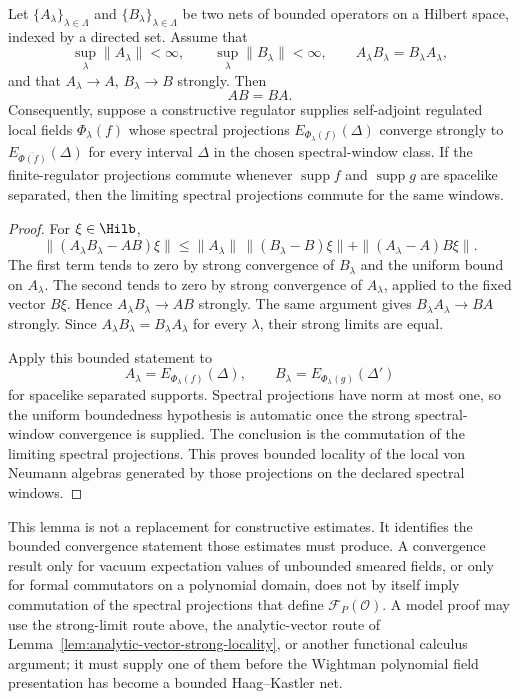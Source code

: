 \begin{lemma}
\label{lem:strong-limit-regulated-locality}
Let \(\{A_\lambda\}_{\lambda\in\Lambda}\) and
\(\{B_\lambda\}_{\lambda\in\Lambda}\) be two nets of bounded operators on a
Hilbert space, indexed by a directed set.  Assume that
\[
  \sup_\lambda\|A_\lambda\|<\infty,\qquad
  \sup_\lambda\|B_\lambda\|<\infty,
  \qquad
  A_\lambda B_\lambda=B_\lambda A_\lambda ,
\]
and that \(A_\lambda\to A\), \(B_\lambda\to B\) strongly.  Then
\[
  AB=BA .
\]
Consequently, suppose a constructive regulator supplies self-adjoint
regulated local fields \(\Phi_\lambda(f)\) whose spectral projections
\(E_{\Phi_\lambda(f)}(\Delta)\) converge strongly to
\(E_{\overline{\Phi(f)}}(\Delta)\) for every interval \(\Delta\) in the
chosen spectral-window class.  If the finite-regulator projections commute
whenever \(\operatorname{supp}f\) and \(\operatorname{supp}g\) are spacelike
separated, then the limiting spectral projections commute for the same
windows.
\end{lemma}

\begin{proof}
For \(\xi\in\Hilb\),
\[
  \|(A_\lambda B_\lambda-AB)\xi\|
  \le
  \|A_\lambda\|\,\|(B_\lambda-B)\xi\|
  +
  \|(A_\lambda-A)B\xi\|.
\]
The first term tends to zero by strong convergence of \(B_\lambda\) and the
uniform bound on \(A_\lambda\).  The second tends to zero by strong
convergence of \(A_\lambda\), applied to the fixed vector \(B\xi\).  Hence
\(A_\lambda B_\lambda\to AB\) strongly.  The same argument gives
\(B_\lambda A_\lambda\to BA\) strongly.  Since
\(A_\lambda B_\lambda=B_\lambda A_\lambda\) for every \(\lambda\), their
strong limits are equal.

Apply this bounded statement to
\[
  A_\lambda=E_{\Phi_\lambda(f)}(\Delta),
  \qquad
  B_\lambda=E_{\Phi_\lambda(g)}(\Delta')
\]
for spacelike separated supports.  Spectral projections have norm at most
one, so the uniform boundedness hypothesis is automatic once the strong
spectral-window convergence is supplied.  The conclusion is the commutation
of the limiting spectral projections.  This proves bounded locality of the
local von Neumann algebras generated by those projections on the declared
spectral windows.
\end{proof}

This lemma is not a replacement for constructive estimates.  It identifies
the bounded convergence statement those estimates must produce.  A convergence
result only for vacuum expectation values of unbounded smeared fields, or only
for formal commutators on a polynomial domain, does not by itself imply
commutation of the spectral projections that define
\(\mathcal F_P(\mathcal O)\).  A model proof may use the strong-limit route
above, the analytic-vector route of
Lemma~\ref{lem:analytic-vector-strong-locality}, or another functional
calculus argument; it must supply one of them before the Wightman polynomial
field presentation has become a bounded Haag--Kastler net.

